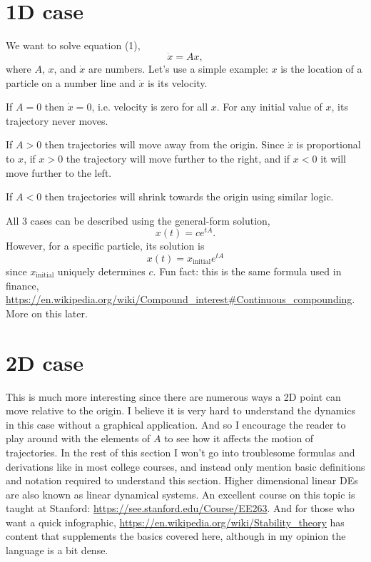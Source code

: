 \documentclass[11pt, oneside]{article}   	%
\begin{document}
\section{1D case}

We want to solve equation (1),
$$\dot{x} = Ax,$$
where $A$, $x$, and $\dot{x}$ are numbers.
Let's use a simple example: $x$ is the location of a particle on a number line and $\dot{x}$ is its velocity.

If $A = 0$ then $\dot{x} = 0$, i.e. velocity is zero for all $x$.
For any initial value of $x$, its trajectory never moves.

If $A > 0$ then trajectories will move away from the origin.
Since $\dot{x}$ is proportional to $x$,
if $x > 0$ the trajectory will move further to the right, and if $x < 0$ it will move further to the left.

If $A < 0$ then trajectories will shrink towards the origin using similar logic.

All 3 cases can be described using the general-form solution,
\begin{equation}
x(t) = ce^{tA} .
\end{equation}
However, for a specific particle, its solution is
\begin{equation}
x(t) = x_\mathrm{initial} e^{tA}
\end{equation}
since $x_\mathrm{initial}$ uniquely determines $c$.
Fun fact: this is the same formula used in finance, \url{https://en.wikipedia.org/wiki/Compound_interest#Continuous_compounding}.
More on this later.


\section{2D case}

This is much more interesting since there are numerous ways a 2D point can move relative to the origin.
I believe it is very hard to understand the dynamics in this case without a graphical application.
And so I encourage the reader to play around with the elements of $A$ to see how it affects the motion of trajectories.
In the rest of this section I won't go into troublesome formulas and derivations like in most college courses,
and instead only mention basic definitions and notation required to understand this section.
Higher dimensional linear DEs are also known as linear dynamical systems.
An excellent course on this topic is taught at Stanford: \url{https://see.stanford.edu/Course/EE263}.
And for those who want a quick infographic,
\url{https://en.wikipedia.org/wiki/Stability_theory} has content that supplements the basics covered here,
although in my opinion the language is a bit dense.
\end{document}
